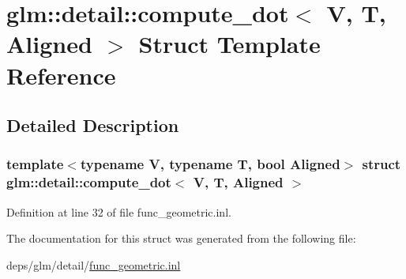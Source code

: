 \hypertarget{structglm_1_1detail_1_1compute__dot}{}\section{glm\+:\+:detail\+:\+:compute\+\_\+dot$<$ V, T, Aligned $>$ Struct Template Reference}
\label{structglm_1_1detail_1_1compute__dot}


\subsection{Detailed Description}
\subsubsection*{template$<$typename V, typename T, bool Aligned$>$\newline
struct glm\+::detail\+::compute\+\_\+dot$<$ V, T, Aligned $>$}



Definition at line 32 of file func\+\_\+geometric.\+inl.



The documentation for this struct was generated from the following file\+:\begin{DoxyCompactItemize}
\item 
deps/glm/detail/\hyperlink{func__geometric_8inl}{func\+\_\+geometric.\+inl}\end{DoxyCompactItemize}
